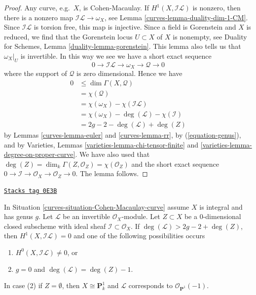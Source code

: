 \begin{proof}

Any curve, e.g.\ $X$, is Cohen-Macaulay.
If $H^1(X, \mathcal{I}\mathcal{L})$ is nonzero, then there is a nonzero
map $\mathcal{I}\mathcal{L} \to \omega_X$, see
Lemma \ref{curves-lemma-duality-dim-1-CM}.
Since $\mathcal{I}\mathcal{L}$ is torsion free, this map is injective.
Since a field is Gorenstein and $X$ is reduced, we find
that the Gorenstein locus $U \subset X$ of $X$ is nonempty, see
Duality for Schemes, Lemma \ref{duality-lemma-gorenstein}.
This lemma also tells us that $\omega_X|_U$ is invertible.
In this way we see we have a short exact sequence
$$
0 \to \mathcal{I}\mathcal{L} \to \omega_X \to \mathcal{Q} \to 0
$$
where the support of $\mathcal{Q}$ is zero dimensional.
Hence we have
\begin{align*}
0 & \leq \dim \Gamma(X, \mathcal{Q})\\
& =
\chi(\mathcal{Q}) \\
& =
\chi(\omega_X) - \chi(\mathcal{I}\mathcal{L}) \\
& =
\chi(\omega_X) - \deg(\mathcal{L}) - \chi(\mathcal{I}) \\
& =
2g - 2 - \deg(\mathcal{L}) + \deg(Z)
\end{align*}
by Lemmas \ref{curves-lemma-euler} and \ref{curves-lemma-rr}, by (\ref{equation-genus}),
and by Varieties, Lemmas \ref{varieties-lemma-chi-tensor-finite}
and \ref{varieties-lemma-degree-on-proper-curve}. We have also used
that $\deg(Z) = \dim_k \Gamma(Z, \mathcal{O}_Z) = \chi(\mathcal{O}_Z)$
and the short exact sequence
$0 \to \mathcal{I} \to \mathcal{O}_X \to \mathcal{O}_Z \to 0$.
The lemma follows.
\end{proof}

\begin{lemma}
\label{curves-lemma-degree-more-than-2g-2}
\href{https://stacks.math.columbia.edu/tag/0E3B}{\texttt{Stacks tag 0E3B}}

\begin{reference}
\cite[Lemma 2]{Jongmin}
\end{reference}
In Situation \ref{curves-situation-Cohen-Macaulay-curve}
assume $X$ is integral and has genus $g$.
Let $\mathcal{L}$ be an invertible $\mathcal{O}_X$-module.
Let $Z \subset X$ be a $0$-dimensional closed subscheme with ideal
sheaf $\mathcal{I} \subset \mathcal{O}_X$.
If $\deg(\mathcal{L}) > 2g - 2 + \deg(Z)$, then
$H^1(X, \mathcal{I}\mathcal{L}) = 0$ and one of the following possibilities
occurs
\begin{enumerate}
\item $H^0(X, \mathcal{I}\mathcal{L}) \not = 0$, or
\item $g = 0$ and $\deg(\mathcal{L}) = \deg(Z) - 1$.
\end{enumerate}
In case (2) if $Z = \emptyset$, then $X \cong \mathbf{P}^1_k$ and $\mathcal{L}$
corresponds to $\mathcal{O}_{\mathbf{P}^1}(-1)$.
\end{lemma}

